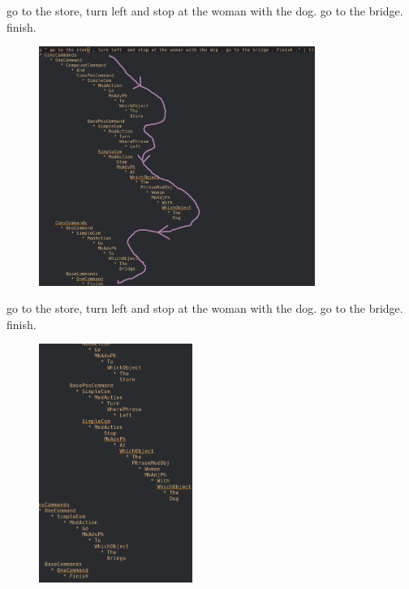 \documentclass{beamer}
\begin{document}
\begin{frame}
\fontsize{9pt}{10pt}\selectfont
\begin{exampleblock}{}
go to the store, turn left and stop at the woman with the dog. go to the bridge. finish.
\end{exampleblock}

\begin{figure}

\centering
\includegraphics[width=90mm]{pics/WithArrow.png}
\end{figure}
\end{frame}



\begin{frame}
\fontsize{9pt}{10pt}\selectfont
\begin{exampleblock}{}
go to the store, turn left and stop at the woman with the dog. go to the bridge.
finish.
\end{exampleblock}

\begin{figure}

\centering
\includegraphics[width=50mm]{pics/zoomedScreenshot.png}
\end{figure}
\end{frame}
\end{document}
